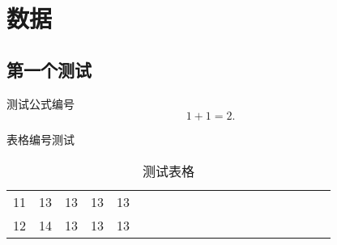 
\chapter{数据}

\section{第一个测试}
测试公式编号
\begin{equation}
  1+1=2.
\end{equation}

表格编号测试

\begin{table}[h]
  \centering
  \caption{测试表格}
  \begin{tabular}{*{20}c}
    \hline
    11 & 13  & 13  & 13  & 13 \\
    12 & 14  & 13  & 13  & 13 \\
    \hline
  \end{tabular}
\end{table}

